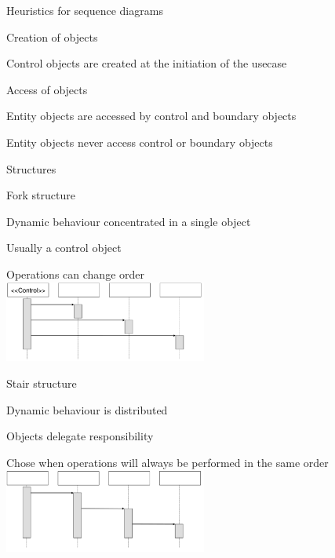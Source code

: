 	\item Heuristics for sequence diagrams
	\enumstart
		\item Creation of objects
		\enumstart
			\item Control objects are created at the initiation of the usecase
		\enumend
		\item Access of objects
		\enumstart
			\item Entity objects are accessed by control and boundary objects
			\item Entity objects never access control or boundary objects
		\enumend
	\enumend

	\item Structures
	\enumstart
		\item Fork structure
		\enumstart
			\item Dynamic behaviour concentrated in a single object
			\item Usually a control object
			\item Operations can change order
			\\ \includegraphics[width=0.5\textwidth]{img/fork_structure.png}
		\enumend
		\item Stair structure
		\enumstart
			\item Dynamic behaviour is distributed
			\item Objects delegate responsibility
			\item Chose when operations will always be performed in the same order
			\\ \includegraphics[width=0.5\textwidth]{img/stair_structure.png}
		\enumend
	\enumend
\enumend


